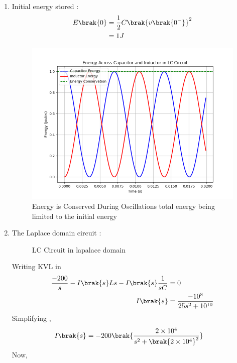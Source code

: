 \documentclass[journal,12pt,twocolumn]{IEEEtran}
\theoremstyle{remark}
\begin{document}
\begin{enumerate}[label=\textbf{(\alph*)}]
    \item Initial energy stored :
    \begin{align}
        E\brak{0}&= \frac{1}{2}C\brak{v\brak{0^-}}^2\\
            &=  1 J 
    \end{align}
\begin{figure}[H]
    \includegraphics[width=1\columnwidth]{ncert-physics/12/7/12/figs/Plot_energy.png}
    \caption{Energy is Conserved During Oscillations total energy being limited to the initial energy}
    \label{fig:energy_plots}
\end{figure}
 \item 
The Laplace domain circuit :
\begin{figure}[H]
    \centering
    \resizebox{0.4\textwidth}{!}{}
    \caption{LC Circuit in lapalace domain}
    \label{fig:ncert_12.7.12_cktdiag_lap}
\end{figure}
Writing KVL in 
\begin{align}
    \frac{-200}{s} - I\brak{s}Ls -I\brak{s}\frac{1}{sC} &= 0\\
    I\brak{s} &= \frac{-10^8}{25s^2 + 10^{10}}\label{eq:ncert12.7.12_i(s)}
\end{align}
Simplifying ,
\begin{align}
    I\brak{s} &= -200\brak{\frac{2\times10^4}{s^2+\brak{2\times10^4}^2}}
\end{align}
Now,
\begin{align}

\end{align}
\end{enumerate}
\end{document}
